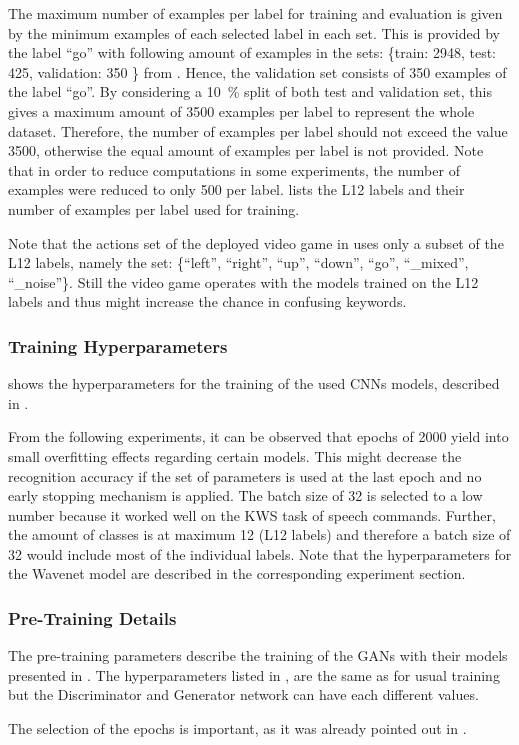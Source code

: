 The maximum number of examples per label for training and evaluation is given by the minimum examples of each selected label in each set.
This is provided by the label \enquote{go} with following amount of examples in the sets: \{train: 2948, test: 425, validation: 350 \} from .
Hence, the validation set consists of 350 examples of the label \enquote{go}.
By considering a \SI{10}{\percent} split of both test and validation set, this gives a maximum amount of 3500 examples per label to represent the whole dataset.
Therefore, the number of examples per label should not exceed the value 3500, otherwise the equal amount of examples per label is not provided.
Note that in order to reduce computations in some experiments, the number of examples were reduced to only 500 per label.
 lists the L12 labels and their number of examples per label used for training.

Note that the actions set of the deployed video game in  uses only a subset of the L12 labels, namely the set: \{\enquote{left},  \enquote{right}, \enquote{up}, \enquote{down}, \enquote{go}, \enquote{\_mixed}, \enquote{\_noise}\}.
Still the video game operates with the models trained on the L12 labels and thus might increase the chance in confusing keywords.



\subsubsection{Training Hyperparameters}
 shows the hyperparameters for the training of the used CNNs models, described in .

From the following experiments, it can be observed that epochs of 2000 yield into small overfitting effects regarding certain models.
This might decrease the recognition accuracy if the set of parameters is used at the last epoch and no early stopping mechanism is applied.
The batch size of 32 is selected to a low number because it worked well on the KWS task of speech commands.
Further, the amount of classes is at maximum 12 (L12 labels) and therefore a batch size of 32 would include most of the individual labels.
Note that the hyperparameters for the Wavenet model are described in the corresponding experiment section.



\subsubsection{Pre-Training Details}
The pre-training parameters describe the training of the GANs with their models presented in .
The hyperparameters listed in , are the same as for usual training but the Discriminator and Generator network can have each different values.

The selection of the epochs is important, as it was already pointed out in .


